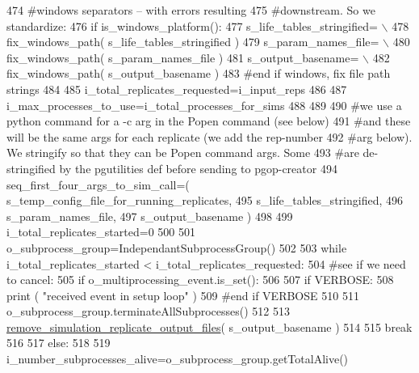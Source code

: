 \begin{DoxyCode}
474         \textcolor{comment}{#windows separators -- with errors resulting}
475         \textcolor{comment}{#downstream.  So we standardize:}
476         \textcolor{keywordflow}{if} is\_windows\_platform():
477             s\_life\_tables\_stringified= \(\backslash\)
478                 fix\_windows\_path( s\_life\_tables\_stringified )
479             s\_param\_names\_file= \(\backslash\)
480                 fix\_windows\_path( s\_param\_names\_file )              
481             s\_output\_basename= \(\backslash\)
482                 fix\_windows\_path( s\_output\_basename )   
483         \textcolor{comment}{#end if windows, fix file path strings}
484 
485         i\_total\_replicates\_requested=i\_input\_reps
486 
487         i\_max\_processes\_to\_use=i\_total\_processes\_for\_sims
488 
489 
490         \textcolor{comment}{#we use a python command for a -c arg in the Popen command (see below)}
491         \textcolor{comment}{#and these will be the same args for each replicate (we add the rep-number}
492         \textcolor{comment}{#arg below).  We stringify so that they can be Popen command args.  Some}
493         \textcolor{comment}{#are de-stringified by the pgutilities def before sending to pgop-creator}
494         seq\_first\_four\_args\_to\_sim\_call=( s\_temp\_config\_file\_for\_running\_replicates,
495                                         s\_life\_tables\_stringified,
496                                         s\_param\_names\_file,
497                                         s\_output\_basename )
498         
499         i\_total\_replicates\_started=0
500 
501         o\_subprocess\_group=IndependantSubprocessGroup()
502 
503         \textcolor{keywordflow}{while} i\_total\_replicates\_started < i\_total\_replicates\_requested:
504             \textcolor{comment}{#see if we need to cancel:  }
505             \textcolor{keywordflow}{if} o\_multiprocessing\_event.is\_set():
506 
507                 \textcolor{keywordflow}{if} VERBOSE:
508                     \textcolor{keywordflow}{print} ( \textcolor{stringliteral}{"received event in setup loop"} )
509                 \textcolor{comment}{#end if VERBOSE}
510 
511                 o\_subprocess\_group.terminateAllSubprocesses()
512                 
513                 \hyperlink{namespacenegui_1_1pgutilities_aa37c7d125e4eaec2eeea639f53fa140d}{remove\_simulation\_replicate\_output\_files}( 
      s\_output\_basename )
514 
515                 \textcolor{keywordflow}{break}
516 
517             \textcolor{keywordflow}{else}:
518 
519                 i\_number\_subprocesses\_alive=o\_subprocess\_group.getTotalAlive()

\end{DoxyCode}
